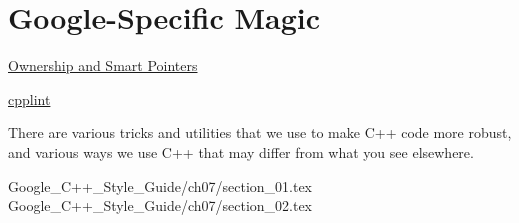 
\chapter{Google-Specific Magic}\label{ch:google-specific-magic}

\begin{introduction}
    \item \hyperref[sec:ownership-and-smart-pointers]{Ownership and Smart Pointers}
    \item \hyperref[sec:cpplint]{cpplint}
\end{introduction}

There are various tricks and utilities that we use to make C++ code more robust, and various ways we use C++ that may differ from what you see elsewhere.

{Google_C++_Style_Guide/ch07/section_01.tex}
{Google_C++_Style_Guide/ch07/section_02.tex}
